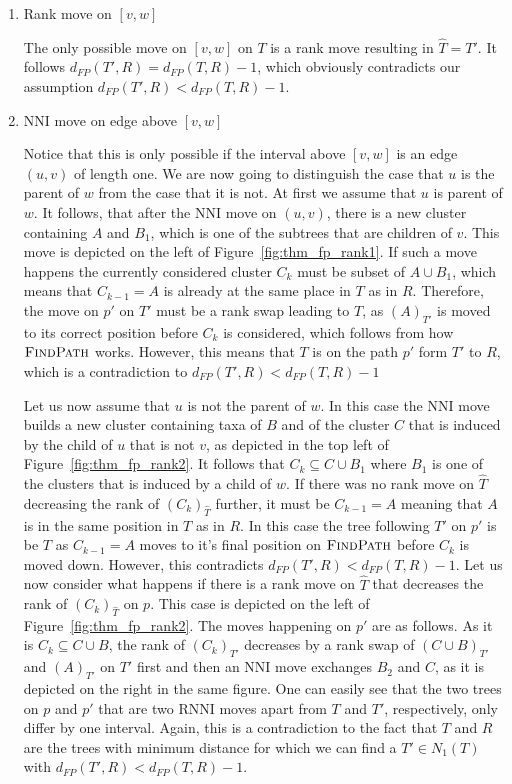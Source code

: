 \documentclass{amsart}
\newcommand{\rnni}{\mathrm{RNNI}}
\newcommand{\findpath}{\textsc{FindPath}}
\newcommand{\nni}{\mathrm{NNI}}
\begin{document}
\begin{enumerate}
    \item Rank move on $[v,w]$

    The only possible move on $[v,w]$ on $T$ is a rank move resulting in $\hat T = T'$.
    It follows $d_{FP}(T',R) = d_{FP}(T,R) - 1$, which obviously contradicts our assumption $d_{FP}(T',R) < d_{FP}(T,R) - 1$.

    \item $\nni$ move on edge above $[v,w]$

    Notice that this is only possible if the interval above $[v,w]$ is an edge $(u,v)$ of length one.
    We are now going to distinguish the case that $u$ is the parent of $w$ from the case that it is not.
    At first we assume that $u$ is parent of $w$.
    It follows, that after the $\nni$ move on $(u,v)$, there is a new cluster containing $A$ and $B_1$, which is one of the subtrees that are children of $v$.
    This move is depicted on the left of Figure~\ref{fig:thm_fp_rank1}.
    If such a move happens the currently considered cluster $C_k$ must be subset of $A \cup B_1$, which means that $C_{k-1} = A$ is already at the same place in $T$ as in $R$.
    Therefore, the move on $p'$ on $T'$ must be a rank swap leading to $T$, as $(A)_{T'}$ is moved to its correct position before $C_k$ is considered, which follows from how $\findpath$ works.
    However, this means that $T$ is on the path $p'$ form $T'$ to $R$, which is a contradiction to $d_{FP}(T',R) < d_{FP}(T,R) - 1$

    Let us now assume that $u$ is not the parent of $w$.
    In this case the $\nni$ move builds a new cluster containing taxa of $B$ and of the cluster $C$ that is induced by the child of $u$ that is not $v$, as depicted in the top left of Figure~\ref{fig:thm_fp_rank2}.
    It follows that $C_k \subseteq C \cup B_1$ where $B_1$ is one of the clusters that is induced by a child of $w$.
    If there was no rank move on $\hat T$ decreasing the rank of $(C_k)_{\hat T}$ further, it must be $C_{k-1} = A$ meaning that $A$ is in the same position in $T$ as in $R$.
    In this case the tree following $T'$ on $p'$ is be $T$ as $C_{k-1} = A$ moves to it's final position on $\findpath$ before $C_k$ is moved down.
    However, this contradicts $d_{FP}(T',R) < d_{FP}(T,R) - 1$.
    Let us now consider what happens if there is a rank move on $\hat T$ that decreases the rank of $(C_k)_{\hat T}$ on $p$.
    This case is depicted on the left of Figure~\ref{fig:thm_fp_rank2}.
    The moves happening on $p'$ are as follows.
    As it is $C_k \subseteq C \cup B$, the rank of $(C_k)_{T'}$ decreases by a rank swap of $(C \cup B)_{T'}$ and $(A)_{T'}$ on $T'$ first and then an $\nni$ move exchanges $B_2$ and $C$, as it is depicted on the right in the same figure.
    One can easily see that the two trees on $p$ and $p'$ that are two $\rnni$ moves apart from $T$ and $T'$, respectively, only differ by one interval.
    Again, this is a contradiction to the fact that $T$ and $R$ are the trees with minimum distance for which we can find a $T' \in N_1(T)$ with $d_{FP}(T',R) < d_{FP}(T,R) - 1$.


\end{enumerate}
\end{document}
